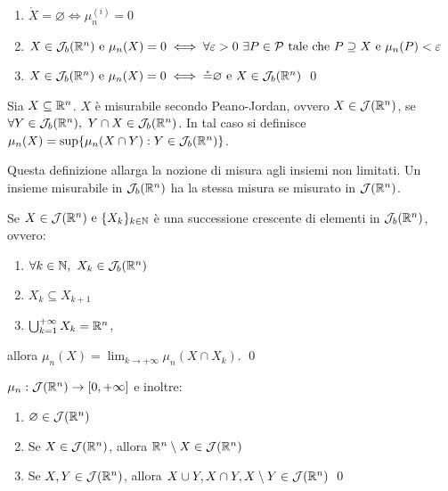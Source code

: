 \begin{theorem}
    \leavevmode
    \begin{enumerate}
        \item $\mathring X = \varnothing \iff \mu_n^{(i)}=0$
        \item $X \in \mathcal{J}_b(\mathbb{R}^n) \text{ e } \mu_n(X)=0 \iff \forall \varepsilon >0 \ \exists P \in \mathcal{P} \text{ tale che } P \supseteq X \text{ e } \mu_n(P)< \varepsilon$
        \item $X \in \mathcal{J}_b(\mathbb{R}^n) \text{ e } \mu_n(X)=0 \iff \mathring = \varnothing \text{ e } X \in \mathcal{J}_b(\mathbb{R}^n)$
        \qed
    \end{enumerate}
\end{theorem}

\begin{definition}
    Sia $X\subseteq \mathbb{R}^n$. $X$ è misurabile secondo Peano-Jordan, ovvero $X \in \mathcal{J}(\mathbb{R}^n)$, se $\forall Y \in \mathcal{J}_b(\mathbb{R}^n), \ Y \cap X \in \mathcal{J}_b(\mathbb{R}^n)$. In tal caso si definisce $\mu_n(X)=\sup\{\mu_n(X\cap Y):Y\in \mathcal{J}_b(\mathbb{R}^n)\}$.
\end{definition}

\begin{remark}
    Questa definizione allarga la nozione di misura agli insiemi non limitati. Un insieme misurabile in $\mathcal{J}_b(\mathbb{R}^n)$ ha la stessa misura se misurato in $\mathcal{J}(\mathbb{R}^n)$.
\end{remark}

\begin{theorem}
    Se $X \in \mathcal{J}(\mathbb{R}^n) \text{ e } \{X_k\}_{k \in \mathbb{N}}$ è una successione crescente di elementi in $\mathcal{J}_b(\mathbb{R}^n)$, ovvero:
    \begin{enumerate}
        \item $\forall k \in \mathbb{N}, \ X_k \in \mathcal{J}_b(\mathbb{R}^n)$
        \item $X_k \subseteq X_{k+1}$
        \item $\bigcup_{k=1}^{+\infty}X_k = \mathbb{R}^n$,
    \end{enumerate}
    allora $\mu_n(X)=\displaystyle\lim_{k\to + \infty}\mu_n(X\cap X_k)$.
    \qed
\end{theorem}

\begin{theorem}
    $\mu_n: \mathcal{J}(\mathbb{R}^n) \to [0, +\infty]$ e inoltre:
    \begin{enumerate}
        \item $\varnothing \in \mathcal{J}(\mathbb{R}^n)$
        \item Se $X \in \mathcal{J}(\mathbb{R}^n)$, allora $\mathbb{R}^n \setminus X \in \mathcal{J}(\mathbb{R}^n)$
        \item Se $X, Y \in \mathcal{J}(\mathbb{R}^n)$, allora $X \cup Y, X \cap Y, X \setminus Y \in \mathcal{J}(\mathbb{R}^n)$
        \qed
    \end{enumerate}
\end{theorem}

